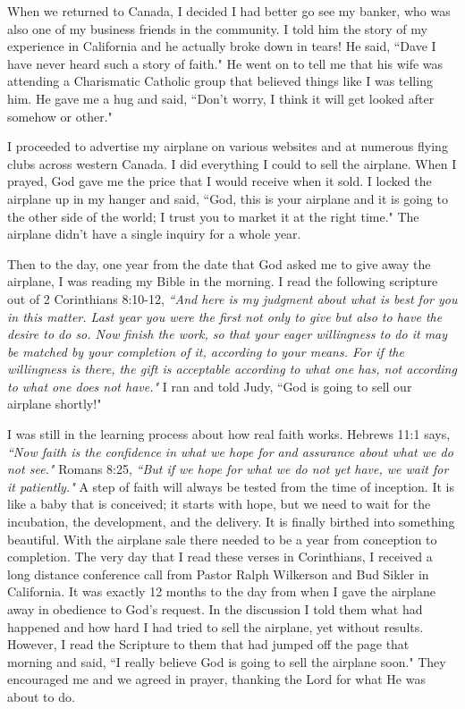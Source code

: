 \documentclass[oneside]{book}
\begin{document}
When we returned to Canada, I decided I had better go see my banker, who was also one of my business friends in the community. I told him the story of my experience in California and he actually broke down in tears! He said, ``Dave I have never heard such a story of faith." He went on to tell me that his wife was attending a Charismatic Catholic group that believed things like I was telling him. He gave me a hug and said, ``Don't worry, I think it will get looked after somehow or other."

I proceeded to advertise my airplane on various websites and at numerous flying clubs across western Canada. I did everything I could to sell the airplane. When I prayed, God gave me the price that I would receive when it sold. I locked the airplane up in my hanger and said, ``God, this is your airplane and it is going to the other side of the world; I trust you to market it at the right time." The airplane didn't have a single inquiry for a whole year. 

Then to the day, one year from the date that God asked me to give away the airplane, I was reading my Bible in the morning. I read the following scripture out of 2 Corinthians 8:10-12, \textit{``And here is my judgment about what is best for you in this matter. Last year you were the first not only to give but also to have the desire to do so. Now finish the work, so that your eager willingness to do it may be matched by your completion of it, according to your means. For if the willingness is there, the gift is acceptable according to what one has, not according to what one does not have."} I ran and told Judy, ``God is going to sell our airplane shortly!" 

I was still in the learning process about how real faith works. Hebrews 11:1 says, \textit{``Now faith is the confidence in what we hope for and assurance about what we do not see."} Romans 8:25, \textit{``But if we hope for what we do not yet have, we wait for it patiently."} A step of faith will always be tested from the time of inception. It is like a baby that is conceived; it starts with hope, but we need to wait for the incubation, the development, and the delivery. It is finally birthed into something beautiful. With the airplane sale there needed to be a year from conception to completion. The very day that I read these verses in Corinthians, I received a long distance conference call from Pastor Ralph Wilkerson and Bud Sikler in California. It was exactly 12 months to the day from when I gave the airplane away in obedience to God's request. In the discussion I told them what had happened and how hard I had tried to sell the airplane, yet without results. However, I read the Scripture to them that had jumped off the page that morning and said, ``I really believe God is going to sell the airplane soon." They encouraged me and we agreed in prayer, thanking the Lord for what He was about to do.
\end{document}
